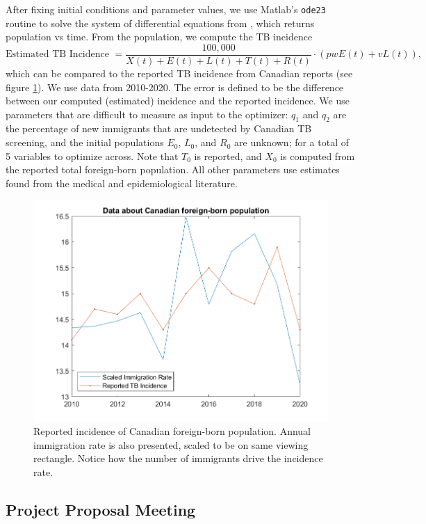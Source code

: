 \documentclass{article}
\begin{document}
After fixing initial conditions and parameter values, we use Matlab's \texttt{ode23} routine to solve the system of differential equations from \cite{GuoWu}, which returns population vs time.  From the population, we compute the TB incidence
$$\text{Estimated TB Incidence } = \frac{100,000}{X(t)+E(t)+L(t)+T(t)+R(t)} \cdot (pw E(t) + v L(t)) ,$$
which can be compared to the reported TB incidence from Canadian reports\cite{MounchiliA.2022TuberculosisReport} (see figure \ref{fig:foreignBornData}).  We use data from 2010-2020.  The error is defined to be the difference between our computed (estimated) incidence and the reported incidence.  We use parameters that are difficult to measure as input to the optimizer: $q_1$ and $q_2$ are the percentage of new immigrants that are undetected by Canadian TB screening, and the initial populations $E_0$, $L_0$, and $R_0$ are unknown; for a total of 5 variables to optimize across.  Note that $T_0$ is reported, and $X_0$ is computed from the reported total foreign-born population.  All other parameters use estimates found from the medical and epidemiological literature.

\begin{figure}
	\centering 
	\includegraphics[scale=0.6]{foreignBornData}
	\caption{Reported incidence of Canadian foreign-born population.  Annual immigration rate is also presented, scaled to be on same viewing rectangle.  Notice how the number of immigrants drive the incidence rate.}
	\label{fig:foreignBornData}
\end{figure}


	\subsection{Project Proposal Meeting}
	
\end{document}
